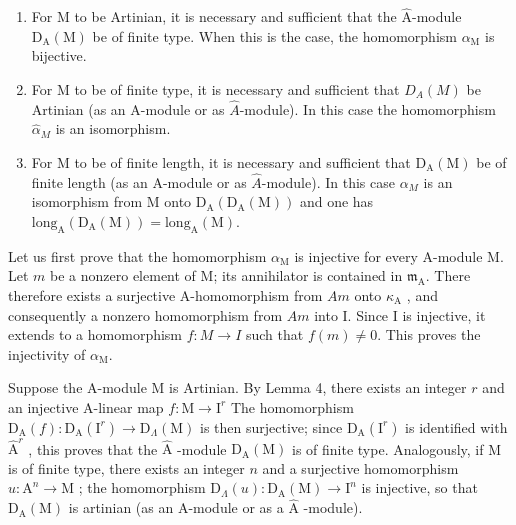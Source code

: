 \begin{enumerate}
\def\labelenumi{\alph{enumi})}
\item
  For M to be Artinian, it is necessary and sufficient that the \(\hat{\mathrm{A}}\)-module \(\mathrm{D}_{\mathrm{A}}(\mathrm{M})\) be of finite type. When this is the case, the homomorphism \(\alpha_{\mathrm{M}}\) is bijective.
\item
  For M to be of finite type, it is necessary and sufficient that \(D_{A}(M)\) be Artinian (as an A-module or as \(\hat{A}\)-module). In this case the homomorphism \(\hat{\alpha}_{M}\) is an isomorphism.
\item
  For M to be of finite length, it is necessary and sufficient that \(\mathrm{D}_{\mathrm{A}}(\mathrm{M})\) be of finite length (as an A-module or as \(\widehat{A}\)-module). In this case \(\alpha_{M}\) is an isomorphism from M onto \(\mathrm{D}_{\mathrm{A}}(\mathrm{D}_{\mathrm{A}}(\mathrm{M}))\) and one has \(\mathrm{long}_{\mathrm{A}}(\mathrm{D}_{\mathrm{A}}(\mathrm{M})) = \mathrm{long}_{\mathrm{A}}(\mathrm{M})\).
\end{enumerate}

Let us first prove that the homomorphism \(\alpha_{\mathrm{M}}\) is injective for every A-module M. Let \(m\) be a nonzero element of M; its annihilator is contained in \(\mathfrak{m}_{\mathrm{A}}\). There therefore exists a surjective A-homomorphism from \(Am\) onto \(\kappa_{\mathrm{A}}\) , and consequently a nonzero homomorphism from \(Am\) into I. Since I is injective, it extends to a homomorphism \(f:M\to I\) such that \(f(m)\neq0\). This proves the injectivity of \(\alpha_{\mathrm{M}}\).

Suppose the A-module M is Artinian. By Lemma 4, there exists an integer \(r\) and an injective A-linear map \(f: \mathrm{M} \to \mathrm{I}^r\) The homomorphism \(\mathrm{D}_{\mathrm{A}}(f): \mathrm{D}_{\mathrm{A}}(\mathrm{I}^r) \longrightarrow \mathrm{D}_{\Lambda}(\mathrm{M})\) is then surjective; since \(\mathrm{D}_{\mathrm{A}}(\mathrm{I}^r)\) is identified with \(\widehat{\mathrm{A}}^r\) , this proves that the \(\widehat{\mathrm{A}}\) -module \(\mathrm{D}_{\mathrm{A}}(\mathrm{M})\) is of finite type. Analogously, if M is of finite type, there exists an integer \(n\) and a surjective homomorphism \(u: \mathrm{A}^n \to \mathrm{M}\) ; the homomorphism \(\mathrm{D}_{\Lambda}(u): \mathrm{D}_{\mathrm{A}}(\mathrm{M}) \to \mathrm{I}^n\) is injective, so that \(\mathrm{D}_{\mathrm{A}}(\mathrm{M})\) is artinian (as an A-module or as a \(\widehat{\mathrm{A}}\) -module).

